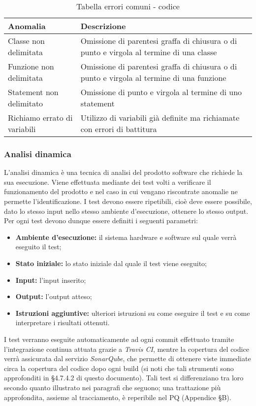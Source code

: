 \documentclass[../NormediProgetto.tex]{subfiles}
\begin{document}
\begin{longtable}{| p{5cm} |p{8cm} |}
	\caption {Tabella errori comuni - codice} \\
	\hline  
	\textbf{Anomalia} & \textbf{Descrizione}  \\ 
	\hline 
	Classe non delimitata & Omissione di parentesi graffa di chiusura o di punto e virgola al termine di una classe \\ 
	\hline 
	Funzione non delimitata & Omissione di parentesi graffa di chiusura o di punto e virgola al termine di una funzione  \\ 
	\hline 
	Statement non delimitato & Omissione di punto e virgola al termine di uno statement \\ 
	\hline 
	Richiamo errato di variabili & Utilizzo di variabili già definite ma richiamate con errori di
	battitura  \\ 
	\hline 
\end{longtable} 

\subsubsection{Analisi dinamica}

L’analisi dinamica è una tecnica di analisi del prodotto software che richiede la sua esecuzione. Viene effettuata mediante dei test volti a verificare il funzionamento del prodotto e nel caso in cui vengano riscontrate anomalie ne permette l’identificazione. I test devono essere ripetibili, cioè deve essere possibile, dato lo stesso input nello stesso ambiente d'esecuzione, ottenere lo stesso output. Per ogni test devono dunque essere definiti i seguenti parametri:

\begin{itemize}
	\item \textbf{Ambiente d'esecuzione:} il sistema hardware e software sul quale verrà eseguito il test;
	\item \textbf{Stato iniziale:} lo stato iniziale dal quale il test viene eseguito;
	\item \textbf{Input:} l’input inserito;
	\item \textbf{Output:} l’output atteso;
	\item \textbf{Istruzioni aggiuntive:} ulteriori istruzioni su come eseguire il test e su come interpretare i risultati ottenuti.
\end{itemize}

I test verranno eseguite automaticamente ad ogni commit effettuato tramite l'integrazione continua attuata grazie a \textit{Travis CI}, mentre la copertura del codice verrà assicurata dal servizio \textit{SonarQube}, che permette di ottenere viste immediate circa la copertura del codice dopo ogni build (si noti che tali strumenti sono approfonditi in §4.7.4.2 di questo documento). Tali test si differenziano tra loro secondo quanto illustrato nei paragrafi che seguono; una
trattazione più approfondita, assieme al tracciamento, è reperibile nel PQ (Appendice §B).
\end{document}
